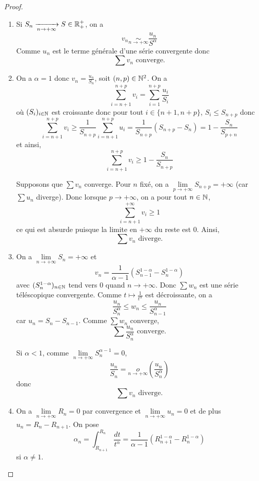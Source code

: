 \begin{proof}
	\phantom{}
	\begin{enumerate}
		\item Si $S_{n}\xrightarrow[n\to+\infty]{}S\in\mathbb{R}^{+}_{+}$, on a $$v_{n}\underset{n\to+\infty}{\sim}\frac{u_{n}}{S^{\alpha}}$$
		Comme $u_{n}$ est le terme générale d'une série convergente donc 
		$$\boxed{\sum v_{n}\text{ converge.}}$$

		\item On a $\alpha=1$ donc $v_{n}=\frac{u_{n}}{S_{n}}$, soit $(n,p)\in\mathbb{N}^{2}$. On a 
		$$\sum_{i=n+1}^{n+p}v_{i}=\sum_{i=1}^{n+p}\frac{u_{i}}{S_{i}}$$
		où $(S_{i})_{i\in\mathbb{N}}$ est croissante donc pour tout $i\in\{n+1,n+p\}$, $S_{i}\leqslant S_{n+p}$
		donc 
		$$\sum_{i=n+1}^{n+p}v_{i}\geqslant\frac{1}{S_{n+p}}\sum_{i=n+1}^{n+p}u_{i}=\frac{1}{S_{n+p}}\left(S_{n+p}-S_{n}\right)=1-\frac{S_{n}}{S_{p+n}}$$
		et ainsi,
		$$\boxed{\sum_{i=n+1}^{n+p}v_{i}\geqslant 1-\frac{S_{n}}{S_{n+p}}}$$

		Supposons que $\sum v_{n}$ converge. Pour $n$ fixé, on a $\lim\limits_{p\to+\infty}S_{n+p}=+\infty$ (car $\sum u_{n}$ diverge). Donc lorsque $p\to+\infty$, on a pour tout $n\in\mathbb{N}$,
		$$\sum_{i=n+1}^{+\infty}v_{i}\geqslant1$$
		ce qui est absurde puisque la limite en $+\infty$ du reste est 0.
		Ainsi,
		$$\boxed{\sum v_{n}\text{ diverge.}}$$

		\item On a $\lim\limits_{n\to+\infty}S_{n}=+\infty$ et 
		$$v_{n}=\frac{1}{\alpha-1}\left(S_{n-1}^{1-\alpha}-S_{n}^{1-\alpha}\right)$$
		avec $(S_{n}^{1-\alpha})_{n\in\mathbb{N}}$ tend vers $0$ quand $n\to+\infty$.
		Donc $\sum w_{n}$ est une série téléscopique convergente. Comme $t\mapsto\frac{1}{t^{\alpha}}$ est décroissante, on a 
		$$\frac{u_{n}}{S_{n}^{\alpha}}\leqslant w_{n}\leqslant \frac{u_{n}}{S_{n-1}^{\alpha}}$$
		car $u_{n}=S_{n}-S_{n-1}$. Comme $\sum w_{n}$ converge, 
		$$\boxed{\sum \frac{u_{n}}{S_{n}^{\alpha}}\text{ converge.}}$$

		Si $\alpha<1$, comme $\lim\limits_{n\to+\infty}S_{n}^{\alpha-1}=0$,
		$$\frac{u_{n}}{S_{n}}=\underset{n\to+\infty}{o}\left(\frac{u_{n}}{S_{n}^{\alpha}}\right)$$
		donc 
		$$\boxed{\sum v_{n}\text{ diverge.}}$$

		\item On a $\lim\limits_{n\to+\infty}R_{n}=0$ par convergence et $\lim\limits_{n\to+\infty}u_{n}=0$ et de plus $u_{n}=R_{n}-R_{n+1}$. On pose 
		$$\alpha_{n}=\int_{R_{n+1}}^{R_{n}}\frac{dt}{t^{\alpha}}=\frac{1}{\alpha-1}\left(R_{n+1}^{1-\alpha}-R_{n}^{1-\alpha}\right)$$
		si $\alpha\neq1$.


\end{enumerate}
\end{proof}
